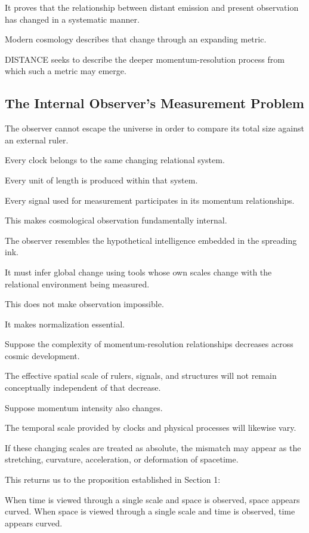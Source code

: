It proves that the relationship between distant emission and present observation has changed in a systematic manner.

Modern cosmology describes that change through an expanding metric.

DISTANCE seeks to describe the deeper momentum-resolution process from which such a metric may emerge.

\subsection*{\textbf{The Internal Observer’s Measurement Problem}}

The observer cannot escape the universe in order to compare its total size against an external ruler.

Every clock belongs to the same changing relational system.

Every unit of length is produced within that system.

Every signal used for measurement participates in its momentum relationships.

This makes cosmological observation fundamentally internal.

The observer resembles the hypothetical intelligence embedded in the spreading ink.

It must infer global change using tools whose own scales change with the relational environment being measured.

This does not make observation impossible.

It makes normalization essential.

Suppose the complexity of momentum-resolution relationships decreases across cosmic development.

The effective spatial scale of rulers, signals, and structures will not remain conceptually independent of that decrease.

Suppose momentum intensity also changes.

The temporal scale provided by clocks and physical processes will likewise vary.

If these changing scales are treated as absolute, the mismatch may appear as the stretching, curvature, acceleration, or deformation of spacetime.

This returns us to the proposition established in Section 1:

When time is viewed through a single scale and space is observed, space appears curved. When space is viewed through a single scale and time is observed, time appears curved.

